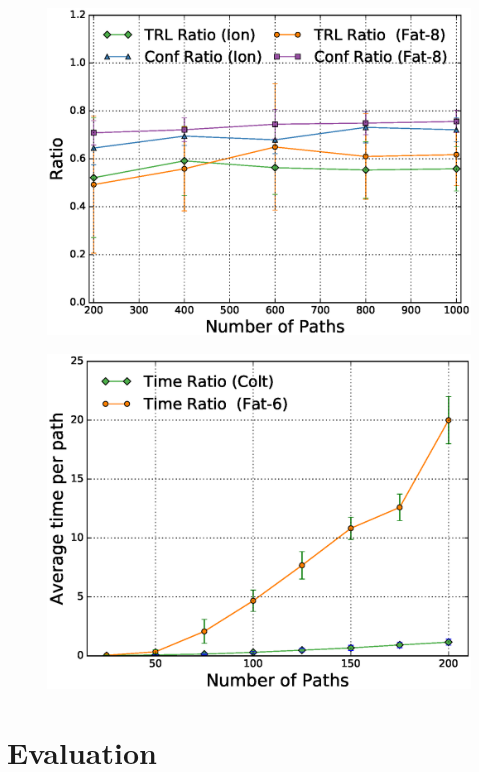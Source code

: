 \begin{figure}[t]
	\centering
	\includegraphics[width=0.7\columnwidth]{figures/ratioMCMC.eps}
	\label{fig:ratiomcmc}
\end{figure}

\begin{figure}[t]
	\centering
	\includegraphics[width=0.7\columnwidth]{figures/ospfTime.eps}
	\label{fig:ratiomcmc}
\end{figure}


\section{Evaluation}